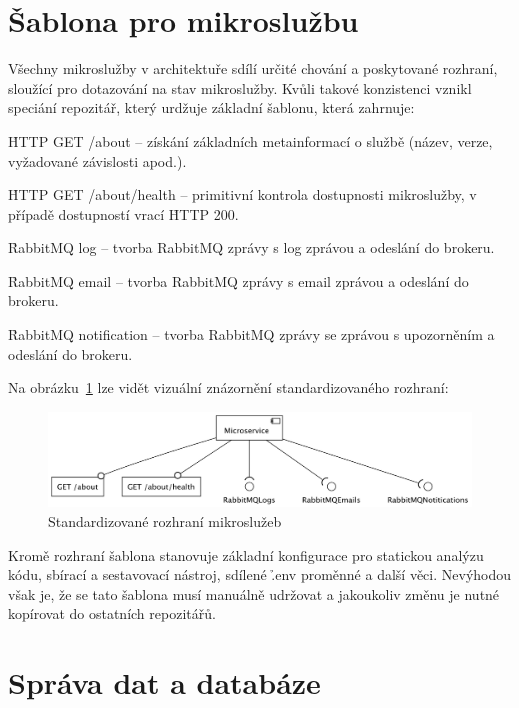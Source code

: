 \section{Šablona pro mikroslužbu}\label{sec:server-template}

Všechny mikroslužby v architektuře sdílí určité chování a poskytované rozhraní, sloužící pro dotazování na stav mikroslužby.
Kvůli takové konzistenci vznikl speciání repozitář, který urdžuje základní šablonu, která zahrnuje:

\begin{ul}
   \item \h{HTTP GET /about} – získání základních metainformací o službě (název, verze, vyžadované závislosti apod.).
   \item \h{HTTP GET /about/health} – primitivní kontrola dostupnosti mikroslužby, v případě dostupností vrací \h{HTTP 200}.
   \item \h{RabbitMQ log} – tvorba RabbitMQ zprávy s log zprávou a odeslání do brokeru.
   \item \h{RabbitMQ email} – tvorba RabbitMQ zprávy s email zprávou a odeslání do brokeru.
   \item \h{RabbitMQ notification} – tvorba RabbitMQ zprávy se zprávou s upozorněním a odeslání do brokeru.
\end{ul}

Na obrázku~\ref{fig:ms-template} lze vidět vizuální znázornění standardizovaného rozhraní:

\begin{figure}[htbp]
   \centering
   \includegraphics[max width=\textwidth]{assets/ms}
   \caption{Standardizované rozhraní mikroslužeb}\label{fig:ms-template}
\end{figure}

Kromě rozhraní šablona stanovuje základní konfigurace pro statickou analýzu kódu, sbírací a sestavovací nástroj, sdílené \h{.env} proměnné a další věci.
Nevýhodou však je, že se tato šablona musí manuálně udržovat a jakoukoliv změnu je nutné kopírovat do ostatních repozitářů.



\section{Správa dat a databáze}\label{sec:server-db}

